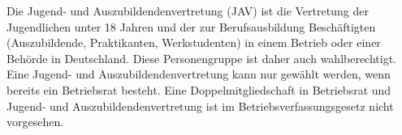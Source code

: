 Die Jugend- und Auszubildendenvertretung (JAV) ist die Vertretung der Jugendlichen unter 18 Jahren und 
der zur Berufsausbildung Beschäftigten (Auszubildende, Praktikanten, Werkstudenten) in einem Betrieb oder einer Behörde in Deutschland.
Diese Personengruppe ist daher auch wahlberechtigt.
\newline
Eine Jugend- und Auszubildendenvertretung kann nur gewählt werden, wenn bereits ein Betriebsrat besteht. 
Eine Doppelmitgliedschaft in Betriebsrat und Jugend- und Auszubildendenvertretung ist im Betriebsverfassungsgesetz nicht vorgesehen. 